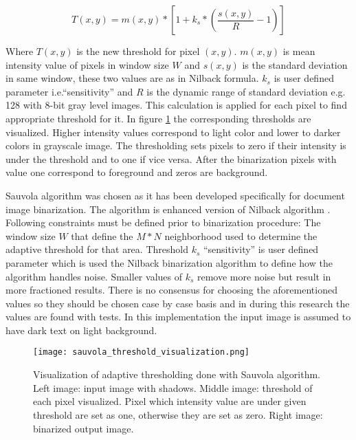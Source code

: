 \documentclass{article}
\begin{document}
          \begin{equation}
            T(x,y) = m(x,y)*\left[1+k_s*\left(\frac{s(x,y)}{R}-1\right)\right]
          \end{equation}

          Where $T(x,y)$ is the new threshold for pixel $(x,y)$. $m(x,y)$ is mean intensity value of pixels in window size $W$ and $s(x,y)$ is the standard deviation in same window, these two values are as in Nilback formula. $k_s$ is user defined parameter i.e.``sensitivity'' and  $R$ is the dynamic range of standard deviation e.g. 128 with 8-bit gray level images. This calculation is applied for each pixel to find appropriate threshold for it. In figure \ref{fig:sauvolathresholdvis} the corresponding thresholds are visualized. Higher intensity values correspond to light color and lower to darker colors in grayscale image. The thresholding sets pixels to zero if their intensity is under the threshold and to one if vice versa. After the binarization pixels with value one correspond to foreground and zeros are background.

          Sauvola algorithm was chosen as it has been developed specifically for document image binarization. The algorithm is enhanced version of Nilback algorithm \cite{Sauvola2000}.  Following constraints must be defined prior to binarization procedure: The window size $W$ that define the $M * N$ neighborhood used to determine the adaptive threshold for that area. Threshold $k_s$ ``sensitivity'' is user defined parameter which is used the Nilback binarization algorithm to define how the algorithm handles noise. Smaller values of $k_s$ remove more noise but result in more fractioned results. There is no consensus for choosing the aforementioned values so they should be chosen case by case basis and in during this research the values are found with tests. In this implementation the input image is assumed to have dark text on light background.

          \begin{figure}[!ht]
            \centering
            \texttt{[image: sauvola\_threshold\_visualization.png]}
            \caption{Visualization of adaptive thresholding done with Sauvola algorithm. Left image: input image with shadows. Middle image: threshold of each pixel visualized. Pixel which intensity value are under given threshold are set as one, otherwise they are set as zero. Right image: binarized output image. \label{fig:sauvolathresholdvis} }
          \end{figure}
\end{document}
